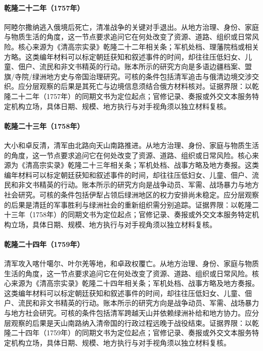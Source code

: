 \hypertarget{social:EQ-1757-AMURSANA-DEATH}{}\paragraph{乾隆二十二年（1757年）}阿睦尔撒纳逃入俄境后死亡，清准战争的关键对手退出。从地方治理、身份、家庭与物质生活的角度，这一节点要求追问它在何处改变了资源、道路、组织或日常风险。核心来源为《清高宗实录》乾隆二十二年相关条；军机处档、理藩院档或相关方略。这类编年材料可以标定朝廷获知和叙述事件的时间，却往往压低妇女、儿童、佃户、流民和非文书精英的行动。账本所示的研究方向是多语边疆档案、盟旗/寺院/绿洲地方史与帝国治理研究。可核的条件包括清军追击与俄清边境交涉交织。应分层观察的后果是其死亡与边境信息须结合俄方材料核对。证据界限：以乾隆二十二年（1757年）的同期文书为定位起点；官修记录、奏报或外交文本服务特定机构立场，具体日期、规模、地方执行与对手视角须以独立材料复核。
\hypertarget{social:EQ-1758-KHOJA-REBELLION}{}\paragraph{乾隆二十三年（1758年）}大小和卓反清，清军由北路向天山南路推进。从地方治理、身份、家庭与物质生活的角度，这一节点要求追问它在何处改变了资源、道路、组织或日常风险。核心来源为《清高宗实录》乾隆二十三年相关条；军机处档、战事方略及地方奏报。这类编年材料可以标定朝廷获知和叙述事件的时间，却往往压低妇女、儿童、佃户、流民和非文书精英的行动。账本所示的研究方向是战争动员、军需、战场暴力与地方社会研究。可核的条件包括伊犁占领后绿洲地区的权力安排尚未稳定。应分层观察的后果是清廷的军事胜利与绿洲社会的重新组织需分别追踪。证据界限：以乾隆二十三年（1758年）的同期文书为定位起点；官修记录、奏报或外交文本服务特定机构立场，具体日期、规模、地方执行与对手视角须以独立材料复核。
\hypertarget{social:EQ-1759-KASHGAR-YARKAND-CAMPAIGN}{}\paragraph{乾隆二十四年（1759年）}清军攻入喀什噶尔、叶尔羌等地，和卓政权覆亡。从地方治理、身份、家庭与物质生活的角度，这一节点要求追问它在何处改变了资源、道路、组织或日常风险。核心来源为《清高宗实录》乾隆二十四年相关条；军机处档、战事方略及地方奏报。这类编年材料可以标定朝廷获知和叙述事件的时间，却往往压低妇女、儿童、佃户、流民和非文书精英的行动。账本所示的研究方向是战争动员、军需、战场暴力与地方社会研究。可核的条件包括清军跨越天山并依赖绿洲补给和地方协力。应分层观察的后果是天山南路纳入清帝国的行政过程远晚于战役结束。证据界限：以乾隆二十四年（1759年）的同期文书为定位起点；官修记录、奏报或外交文本服务特定机构立场，具体日期、规模、地方执行与对手视角须以独立材料复核。
